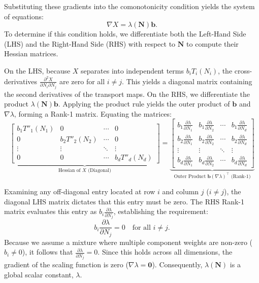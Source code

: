 \documentclass[12pt,a4paper,twoside,openany]{book}
\begin{document}
Substituting these gradients into the comonotonicity condition yields the system of equations:
\begin{equation}
    \nabla X = \lambda(\mathbf{N}) \mathbf{b}.
\end{equation}
To determine if this condition holds, we differentiate both the Left-Hand Side (LHS) and the Right-Hand Side (RHS) 
with respect to $\mathbf{N}$ to compute their Hessian matrices.

On the LHS, because $X$ separates into independent terms $b_i T_i(N_i)$, the cross-derivatives $\frac{\partial^2 X}{\partial N_i \partial N_j}$ 
are zero for all $i \neq j$. This yields a diagonal matrix containing the second derivatives of the transport maps. On the RHS, 
we differentiate the product $\lambda(\mathbf{N}) \mathbf{b}$. Applying the product rule yields the outer product of $\mathbf{b}$ 
and $\nabla \lambda$, forming a Rank-1 matrix.
Equating the matrices:
\begin{equation}
    \underbrace{
    \begin{bmatrix} 
    b_1 T''_1(N_1) & 0 & \cdots & 0 \\
    0 & b_2 T''_2(N_2) & \cdots & 0 \\
    \vdots & \vdots & \ddots & \vdots \\
    0 & 0 & \cdots & b_d T''_d(N_d)
    \end{bmatrix}
    }_{\text{Hessian of } X \text{ (Diagonal)}}
    =
    \underbrace{
    \begin{bmatrix}
    b_1 \frac{\partial \lambda}{\partial N_1} & b_1 \frac{\partial \lambda}{\partial N_2} & \cdots & b_1 \frac{\partial \lambda}{\partial N_d} \\
    b_2 \frac{\partial \lambda}{\partial N_1} & b_2 \frac{\partial \lambda}{\partial N_2} & \cdots & b_2 \frac{\partial \lambda}{\partial N_d} \\
    \vdots & \vdots & \ddots & \vdots \\
    b_d \frac{\partial \lambda}{\partial N_1} & b_d \frac{\partial \lambda}{\partial N_2} & \cdots & b_d \frac{\partial \lambda}{\partial N_d}
    \end{bmatrix}
    }_{\text{Outer Product } \mathbf{b} (\nabla \lambda)^\top \text{ (Rank-1)}}
\end{equation}

Examining any off-diagonal entry located at row $i$ and column $j$ ($i \neq j$), the diagonal LHS matrix dictates that 
this entry must be zero. The RHS Rank-1 matrix evaluates this entry as $b_i \frac{\partial \lambda}{\partial N_j}$, establishing the requirement:
\begin{equation}
    b_i \frac{\partial \lambda}{\partial N_j} = 0 \quad \text{for all } i \neq j.
\end{equation}
Because we assume a mixture where multiple component weights are non-zero ($b_i \neq 0$), it follows that $\frac{\partial \lambda}{\partial N_j} = 0$. 
Since this holds across all dimensions, the gradient of the scaling function is zero ($\nabla \lambda = \mathbf{0}$). 
Consequently, $\lambda(\mathbf{N})$ is a global scalar constant, $\lambda$.
\end{document}

